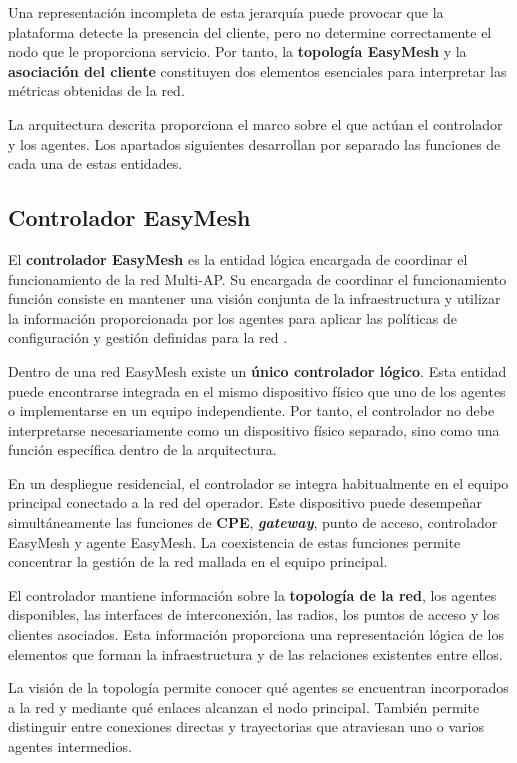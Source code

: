 Una representación incompleta de esta jerarquía puede provocar que la
plataforma detecte la presencia del cliente, pero no determine
correctamente el nodo que le proporciona servicio. Por tanto, la
\textbf{topología EasyMesh} y la
\textbf{asociación del cliente} constituyen dos elementos esenciales para
interpretar las métricas obtenidas de la red.

La arquitectura descrita proporciona el marco sobre el que actúan el
controlador y los agentes. Los apartados siguientes desarrollan por
separado las funciones de cada una de estas entidades.

\subsection{Controlador EasyMesh}
\label{subsec:controlador-easymesh}

El \textbf{controlador EasyMesh} es la entidad lógica encargada de
coordinar el funcionamiento de la red Multi-AP. Su encargada de
coordinar el funcionamiento función consiste en
mantener una visión conjunta de la infraestructura y utilizar la
información proporcionada por los agentes para aplicar las políticas de
configuración y gestión definidas para la red
\cite{wifi_alliance_easymesh}.

Dentro de una red EasyMesh existe un
\textbf{único controlador lógico}. Esta entidad puede encontrarse
integrada en el mismo dispositivo físico que uno de los agentes o
implementarse en un equipo independiente. Por tanto, el controlador no
debe interpretarse necesariamente como un dispositivo físico separado,
sino como una función específica dentro de la arquitectura.

En un despliegue residencial, el controlador se integra habitualmente en
el equipo principal conectado a la red del operador. Este dispositivo
puede desempeñar simultáneamente las funciones de
\textbf{CPE}, \textbf{\textit{gateway}}, punto de acceso,
controlador EasyMesh y agente EasyMesh. La coexistencia de estas
funciones permite concentrar la gestión de la red mallada en el equipo
principal.

El controlador mantiene información sobre la
\textbf{topología de la red}, los agentes disponibles, las interfaces de
interconexión, las radios, los puntos de acceso y los clientes asociados.
Esta información proporciona una representación lógica de los elementos
que forman la infraestructura y de las relaciones existentes entre
ellos.

La visión de la topología permite conocer qué agentes se encuentran
incorporados a la red y mediante qué enlaces alcanzan el nodo principal.
También permite distinguir entre conexiones directas y trayectorias que
atraviesan uno o varios agentes intermedios.

